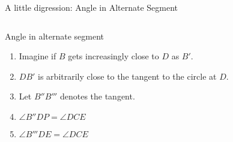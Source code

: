 \documentclass{beamer}
\begin{document}
\begin{frame}{A little digression: Angle in Alternate Segment}
\begin{columns}
		\begin{minipage}{0.9\textwidth}
			\begin{block}{Angle in alternate segment}
				\begin{enumerate}
					\item Imagine if $B$ gets increasingly close to $D$ as $B'$.
					\pause
					\item $DB'$ is arbitrarily close to the tangent to the circle at $D$.
					\item Let $B''B'''$ denotes the tangent.
					\pause
					\item $\angle B''DP = \angle DCE$
					\pause
					\item $\angle B'''DE = \angle DCE$
				\end{enumerate}
			\end{block}
		\end{minipage}
	\end{columns}
\end{frame}
\end{document}

